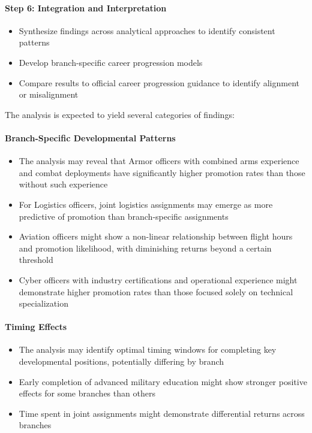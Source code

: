 \documentclass[../main.tex]{subfiles}
\begin{document}
\paragraph{Step 6: Integration and Interpretation}
\begin{itemize}
\item Synthesize findings across analytical approaches to identify consistent patterns
\item Develop branch-specific career progression models
\item Compare results to official career progression guidance to identify alignment or misalignment
\end{itemize}


The analysis is expected to yield several categories of findings:

\paragraph{Branch-Specific Developmental Patterns}
\begin{itemize}
\item The analysis may reveal that Armor officers with combined arms experience and combat deployments have significantly higher promotion rates than those without such experience
\item For Logistics officers, joint logistics assignments may emerge as more predictive of promotion than branch-specific assignments
\item Aviation officers might show a non-linear relationship between flight hours and promotion likelihood, with diminishing returns beyond a certain threshold
\item Cyber officers with industry certifications and operational experience might demonstrate higher promotion rates than those focused solely on technical specialization
\end{itemize}

\paragraph{Timing Effects}
\begin{itemize}
\item The analysis may identify optimal timing windows for completing key developmental positions, potentially differing by branch
\item Early completion of advanced military education might show stronger positive effects for some branches than others
\item Time spent in joint assignments might demonstrate differential returns across branches
\end{itemize}
\end{document}
